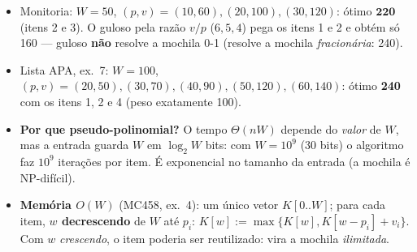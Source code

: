 \begin{itemize}
  \item Monitoria: $W=50$, $(p,v)=(10,60),(20,100),(30,120)$: ótimo $\mathbf{220}$ (itens 2 e 3). O guloso pela razão $v/p$ ($6,5,4$) pega os itens 1 e 2 e obtém só 160 --- guloso \textbf{não} resolve a mochila 0-1 (resolve a mochila \emph{fracionária}: 240).
  \item Lista APA, ex.~7: $W=100$, $(p,v)=(20,50),(30,70),(40,90),(50,120),(60,140)$: ótimo \textbf{240} com os itens 1, 2 e 4 (peso exatamente 100).
  \item \textbf{Por que pseudo-polinomial?} O tempo $\Theta(nW)$ depende do \emph{valor} de $W$, mas a entrada guarda $W$ em $\log_2W$ bits: com $W=10^9$ (30 bits) o algoritmo faz $10^9$ iterações por item. É exponencial no tamanho da entrada (a mochila é NP-difícil).
  \item \textbf{Memória $O(W)$} (MC458, ex.~4): um único vetor $K[0..W]$; para cada item, \textbf{$w$ decrescendo} de $W$ até $p_i$: $K[w]:=\max\{K[w],K[w-p_i]+v_i\}$. Com $w$ \emph{crescendo}, o item poderia ser reutilizado: vira a mochila \emph{ilimitada}.
\end{itemize}

